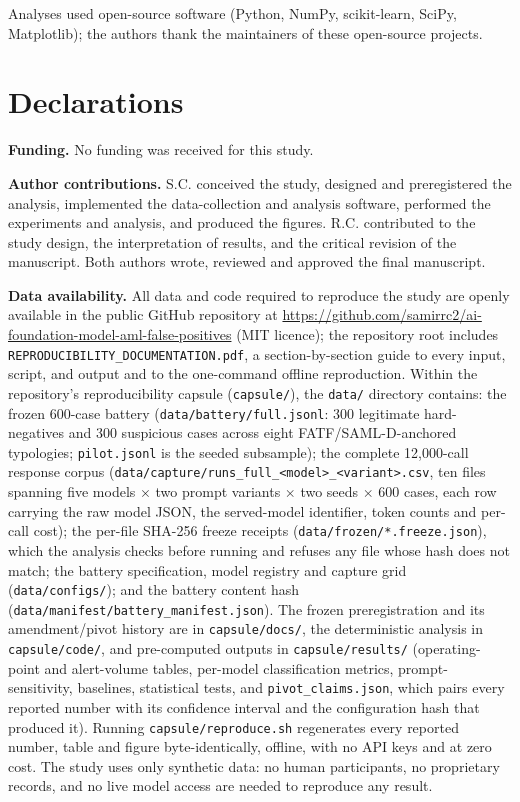\documentclass[pdflatex,sn-basic,Numbered]{sn-jnl}
\begin{document}
\clearpage
\backmatter

Analyses used open-source software (Python, NumPy, scikit-learn, SciPy, Matplotlib); the authors thank the maintainers of these open-source projects.

\section*{Declarations}

\textbf{Funding.} No funding was received for this study.

\textbf{Author contributions.} S.C. conceived the study, designed and preregistered the analysis, implemented the data-collection and analysis software, performed the experiments and analysis, and produced the figures. R.C. contributed to the study design, the interpretation of results, and the critical revision of the manuscript. Both authors wrote, reviewed and approved the final manuscript.

\textbf{Data availability.} All data and code required to reproduce the study are openly available in the public GitHub repository at \url{https://github.com/samirrc2/ai-foundation-model-aml-false-positives} (MIT licence); the repository root includes \texttt{REPRODUCIBILITY\_DOCUMENTATION.pdf}, a section-by-section guide to every input, script, and output and to the one-command offline reproduction. Within the repository's reproducibility capsule (\texttt{capsule/}), the \texttt{data/} directory contains: the frozen 600-case battery (\texttt{data/battery/full.jsonl}: 300 legitimate hard-negatives and 300 suspicious cases across eight FATF/SAML-D-anchored typologies; \texttt{pilot.jsonl} is the seeded subsample); the complete 12,000-call response corpus (\texttt{data/capture/runs\_full\_<model>\_<variant>.csv}, ten files spanning five models $\times$ two prompt variants $\times$ two seeds $\times$ 600 cases, each row carrying the raw model JSON, the served-model identifier, token counts and per-call cost); the per-file SHA-256 freeze receipts (\texttt{data/frozen/*.freeze.json}), which the analysis checks before running and refuses any file whose hash does not match; the battery specification, model registry and capture grid (\texttt{data/configs/}); and the battery content hash (\texttt{data/manifest/battery\_manifest.json}). The frozen preregistration and its amendment/pivot history are in \texttt{capsule/docs/}, the deterministic analysis in \texttt{capsule/code/}, and pre-computed outputs in \texttt{capsule/results/} (operating-point and alert-volume tables, per-model classification metrics, prompt-sensitivity, baselines, statistical tests, and \texttt{pivot\_claims.json}, which pairs every reported number with its confidence interval and the configuration hash that produced it). Running \texttt{capsule/reproduce.sh} regenerates every reported number, table and figure byte-identically, offline, with no API keys and at zero cost. The study uses only synthetic data: no human participants, no proprietary records, and no live model access are needed to reproduce any result.
\end{document}
